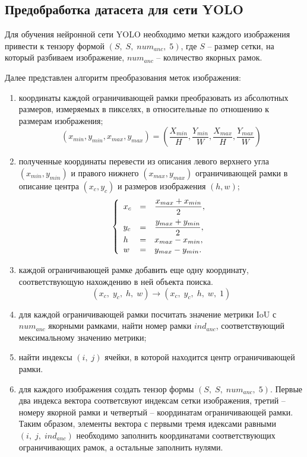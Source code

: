 \documentclass[14pt,a4paper]{extarticle}
\begin{document}
\newpage
\subsection{Предобработка датасета для сети YOLO}
Для обучения нейронной сети YOLO необходимо метки каждого изображения привести к тензору формой $\left(S,\;S,\;num_{anc},\;5\right)$, где $S$ -- размер сетки, на который разбиваем изображение, $num_{anc}$ -- количество якорных рамок. 

Далее представлен алгоритм преобразования меток изображения:
\begin{enumerate}
\item координаты каждой ограничивающей рамки преобразовать из абсолютных размеров, измеряемых в пикселях, в относительные по отношению к размерам изображения;
\begin{equation}
\left(x_{min}, y_{min}, x_{max}, y_{max}\right) = \left(\dfrac{X_{min}}{H}, \dfrac{Y_{min}}{W}, \dfrac{X_{max}}{H}, \dfrac{Y_{max}}{W}\right)
\end{equation}
\item полученные координаты перевести из описания левого верхнего угла $(x_{min}, y_{min})$ и правого нижнего $(x_{max}, y_{max})$ ограничивающей рамки в описание центра $(x_{c}, y_{c})$ и размеров изображения $(h, w)$;
\begin{equation}
\left\{
\begin{array}{lcl}
\vspace*{0.2cm}x_c & = & \dfrac{x_{max}+x_{min}}{2}, \\

y_c & = & \dfrac{y_{max}+y_{min}}{2}, \\
h & = & x_{max}-x_{min}, \\
w & = & y_{max}-y_{min}.
\end{array}
\right.
\end{equation}
\item каждой ограничивающей рамке добавить еще одну координату, соответствующую нахождению в ней объекта поиска.
\begin{equation}
\left(
x_c,\; y_c,\; h,\; w
\right) \longrightarrow \left(
x_c,\; y_c,\; h,\; w,\; 1
\right) 
\end{equation}
\item для каждой ограничивающей рамки посчитать значение метрики IoU с $num_{anc}$ якорными рамками, найти номер рамки $ind_{anc}$, соответствующий мексимальному значению метрики;
\item  найти индексы $(i,\;j)$ ячейки, в которой находится центр ограничивающей рамки.
\item для каждого изображения создать тензор формы $\left(S,\;S,\;num_{anc},\;5\right)$. Первые два индекса вектора соответсвуют индексам сетки изображения, третий -- номеру якорной рамки и четвертый  -- координатам ограничивающей рамки. Таким образом, элементы вектора с первыми тремя идексами равными $(i,\;j,\;ind_{anc})$ необходимо заполнить координатами соответствующих ограничивающих рамок, а остальные заполнить нулями.
\end{enumerate}
\end{document}
